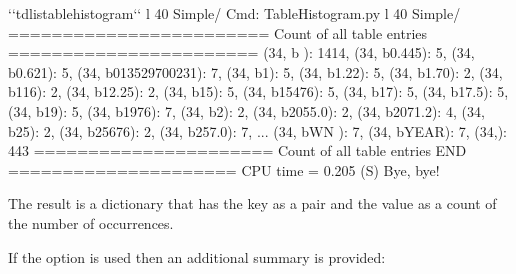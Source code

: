 \documentclass[letterpaper,10pt,english]{sphinxmanual}
\begin{document}
\begin{sphinxVerbatim}[commandchars=\\\{\}]
\PYGZdl{} {}`{}`tdlistablehistogram{}`{}` \PYGZhy{}l 40 Simple/
Cmd: TableHistogram.py \PYGZhy{}l 40 Simple/
======================== Count of all table entries =======================
\PYGZob{}\PYGZdq{}(34, b\PYGZsq{}    \PYGZsq{})\PYGZdq{}: 1414,
 \PYGZdq{}(34, b\PYGZsq{}0.445\PYGZsq{})\PYGZdq{}: 5,
 \PYGZdq{}(34, b\PYGZsq{}0.621\PYGZsq{})\PYGZdq{}: 5,
 \PYGZdq{}(34, b\PYGZsq{}013529700231\PYGZsq{})\PYGZdq{}: 7,
 \PYGZdq{}(34, b\PYGZsq{}1\PYGZsq{})\PYGZdq{}: 5,
 \PYGZdq{}(34, b\PYGZsq{}1.22\PYGZsq{})\PYGZdq{}: 5,
 \PYGZdq{}(34, b\PYGZsq{}1.70\PYGZsq{})\PYGZdq{}: 2,
 \PYGZdq{}(34, b\PYGZsq{}116\PYGZsq{})\PYGZdq{}: 2,
 \PYGZdq{}(34, b\PYGZsq{}12.25\PYGZsq{})\PYGZdq{}: 2,
 \PYGZdq{}(34, b\PYGZsq{}15\PYGZsq{})\PYGZdq{}: 5,
 \PYGZdq{}(34, b\PYGZsq{}15\PYGZhy{}4\PYGZhy{}76\PYGZsq{})\PYGZdq{}: 5,
 \PYGZdq{}(34, b\PYGZsq{}17\PYGZsq{})\PYGZdq{}: 5,
 \PYGZdq{}(34, b\PYGZsq{}17.5\PYGZsq{})\PYGZdq{}: 5,
 \PYGZdq{}(34, b\PYGZsq{}19\PYGZsq{})\PYGZdq{}: 5,
 \PYGZdq{}(34, b\PYGZsq{}1976\PYGZsq{})\PYGZdq{}: 7,
 \PYGZdq{}(34, b\PYGZsq{}2\PYGZsq{})\PYGZdq{}: 2,
 \PYGZdq{}(34, b\PYGZsq{}2055.0\PYGZsq{})\PYGZdq{}: 2,
 \PYGZdq{}(34, b\PYGZsq{}2071.2\PYGZsq{})\PYGZdq{}: 4,
 \PYGZdq{}(34, b\PYGZsq{}25\PYGZsq{})\PYGZdq{}: 2,
 \PYGZdq{}(34, b\PYGZsq{}25\PYGZhy{}6\PYGZhy{}76\PYGZsq{})\PYGZdq{}: 2,
 \PYGZdq{}(34, b\PYGZsq{}257.0\PYGZsq{})\PYGZdq{}: 7,
...
 \PYGZdq{}(34, b\PYGZsq{}WN  \PYGZsq{})\PYGZdq{}: 7,
 \PYGZdq{}(34, b\PYGZsq{}YEAR\PYGZsq{})\PYGZdq{}: 7,
 \PYGZsq{}(34,)\PYGZsq{}: 443\PYGZcb{}
====================== Count of all table entries END =====================
CPU time =    0.205 (S)
Bye, bye!
\end{sphinxVerbatim}

The result is a dictionary that has the key as a pair  and the value as a count of the number of occurrences.

If the  option is used then an additional summary is provided:
\end{document}
